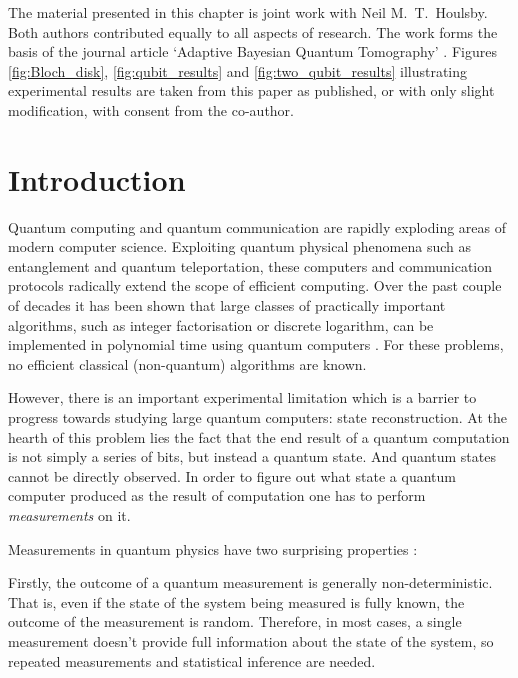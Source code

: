 
\begin{summarycontributions}
 The material presented in this chapter is joint work with Neil M.\ T.\ Houlsby. Both authors contributed equally to all aspects of research. The work forms the basis of the journal article `Adaptive Bayesian Quantum Tomography' \citep{Huszar2012quantum}. Figures \ref{fig:Bloch_disk}, \ref{fig:qubit_results} and \ref{fig:two_qubit_results} illustrating experimental results are taken from this paper as published, or with only slight modification, with consent from the co-author.
\end{summarycontributions}

\section{Introduction}

Quantum computing and quantum communication are rapidly exploding areas of modern computer science. Exploiting quantum physical phenomena such as entanglement and quantum teleportation, these computers and communication protocols radically extend the scope of efficient computing. Over the past couple of decades it has been shown that large classes of practically important algorithms, such as integer factorisation or discrete logarithm, can be implemented in polynomial time using quantum computers \citep{Shor1994,Shor1997}. For these problems, no efficient classical (non-quantum) algorithms are known.

However, there is an important experimental limitation which is a barrier to progress towards studying large quantum computers: state reconstruction. At the hearth of this problem lies the fact that the end result of a quantum computation is not simply a series of bits, but instead a quantum state. And quantum states cannot be directly observed. In order to figure out what state a quantum computer produced as the result of computation one has to perform \emph{measurements} on it.

Measurements in quantum physics have two surprising properties	:

Firstly, the outcome of a quantum measurement is generally non-deterministic. That is, even if the state of the system being measured is fully known, the outcome of the measurement is random. Therefore, in most cases, a single measurement doesn't provide full information about the state of the system, so repeated measurements and statistical inference are needed.

